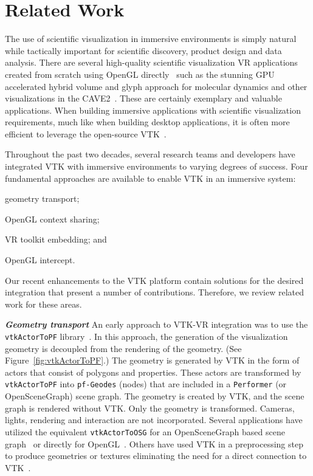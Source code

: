 \section{Related Work}

The use of scientific visualization in immersive environments is simply natural while tactically important for scientific discovery, product design and data analysis.
There are several high-quality scientific visualization VR applications created from scratch using OpenGL directly~\cite{Billen:2008, LaViola:2007, Schulze:2001, Rantzau:1998} such as the stunning GPU accelerated hybrid volume and glyph approach for molecular dynamics and other visualizations in the CAVE2~\cite{Reda:2013, Reda:2013a}.
These are certainly exemplary and valuable applications.
When building immersive applications with scientific visualization requirements, much like when building desktop applications, it is often more efficient to leverage the open-source VTK~\cite{Schroeder:2004}.

Throughout the past two decades, several research teams and developers have integrated VTK with immersive environments to varying degrees of success.
Four fundamental approaches are available to enable VTK in an immersive system:

\begin{compactitem}
\item geometry transport;
\item OpenGL context sharing;
\item VR toolkit embedding; and
\item OpenGL intercept.
\end{compactitem}

Our recent enhancements to the VTK platform contain solutions for the desired integration that present a number of contributions. Therefore, we review related work for these areas.

\textbf{\textit{Geometry transport}}
An early approach to VTK-VR integration was to use the \texttt{vtkActorToPF} library~\cite{Leigh98limbo/vtk}.
In this approach, the generation of the visualization geometry is decoupled from
the rendering of the geometry. (See Figure~\ref{fig:vtkActorToPF}.) 
The geometry is generated by VTK in the form of actors that consist of polygons and properties.
These actors are transformed by \texttt{vtkActorToPF} into \texttt{pf-Geodes} (nodes) that are included in a \texttt{Performer} (or OpenSceneGraph) scene graph. The geometry is created by VTK, and the scene graph is rendered without VTK. Only the geometry is transformed. Cameras, lights, rendering and interaction are not incorporated. Several applications have utilized the equivalent \texttt{vtkActorToOSG} for an OpenSceneGraph based scene graph~\cite{VE-Suite:2016} or directly for OpenGL~\cite{Ohno:2006}. Others have used VTK in a preprocessing step to produce geometries or textures eliminating the need for a direct connection to VTK~\cite{Bivins:2005}.

